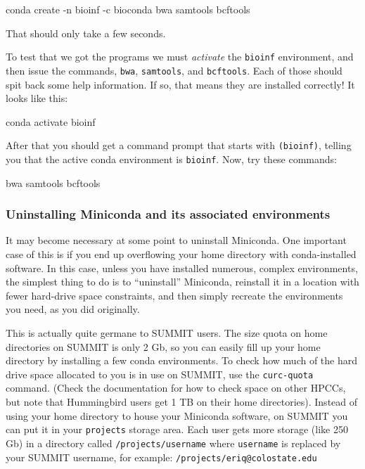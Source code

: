 \documentclass[]{krantz}
\makeatletter
\newenvironment{Shaded}{\begin{snugshade}}{\end{snugshade}}
\newcommand{\ExtensionTok}[1]{#1}
\newcommand{\NormalTok}[1]{#1}
\newenvironment{kframe}{%
\medskip{}
\setlength{\fboxsep}{.8em}
 \def\at@end@of@kframe{}%
 \ifinner\ifhmode%
  \def\at@end@of@kframe{\end{minipage}}%
  \begin{minipage}{\columnwidth}%
 \fi\fi%
 \def\FrameCommand##1{\hskip\@totalleftmargin \hskip-\fboxsep
 \colorbox{shadecolor}{##1}\hskip-\fboxsep
     \hskip-\linewidth \hskip-\@totalleftmargin \hskip\columnwidth}%
 \MakeFramed {\advance\hsize-\width
   \@totalleftmargin\z@ \linewidth\hsize
   \@setminipage}}%
 {\par\unskip\endMakeFramed%
 \at@end@of@kframe}
\renewenvironment{Shaded}{\begin{kframe}}{\end{kframe}}
\makeatother
\begin{document}
\begin{Shaded}
\begin{Highlighting}[]
\ExtensionTok{conda}\NormalTok{ create -n bioinf -c bioconda bwa samtools bcftools}
\end{Highlighting}
\end{Shaded}

That should only take a few seconds.

To test that we got the programs we must \emph{activate} the \texttt{bioinf} environment, and then issue
the commands, \texttt{bwa}, \texttt{samtools}, and \texttt{bcftools}. Each of those should spit back some help
information. If so, that means they are installed correctly! It looks like this:

\begin{Shaded}
\begin{Highlighting}[]
\ExtensionTok{conda}\NormalTok{ activate bioinf}
\end{Highlighting}
\end{Shaded}

After that you should get a command prompt that starts with \texttt{(bioinf)}, telling you that the
active conda environment is \texttt{bioinf}. Now, try these commands:

\begin{Shaded}
\begin{Highlighting}[]
\ExtensionTok{bwa}
\ExtensionTok{samtools}
\ExtensionTok{bcftools}
\end{Highlighting}
\end{Shaded}

\hypertarget{uninstalling-miniconda-and-its-associated-environments}{%
\subsubsection{Uninstalling Miniconda and its associated environments}\label{uninstalling-miniconda-and-its-associated-environments}}

It may become necessary at some point to uninstall Miniconda. One important case of this
is if you end up overflowing your home directory with conda-installed software. In this case,
unless you have installed numerous, complex environments, the simplest thing to do is
to ``uninstall'' Miniconda, reinstall it in a location with fewer hard-drive space constraints,
and then simply recreate the environments you need, as you did originally.

This is actually quite germane to SUMMIT users. The size quota on home directories on SUMMIT is
only 2 Gb, so you can easily fill up your home directory by installing a few conda environments.
To check how much of the hard
drive space allocated to you is in use on SUMMIT, use the \texttt{curc-quota} command. (Check the documentation
for how to check space on other HPCCs, but note that Hummingbird users get 1 TB on their home
directories). Instead of
using your home directory to house your Miniconda software, on SUMMIT you can put it in your
\texttt{projects} storage area. Each user gets more storage (like 250 Gb) in a directory
called \texttt{/projects/username} where \texttt{username} is replaced by your SUMMIT username,
for example: \texttt{/projects/eriq@colostate.edu}
\end{document}
